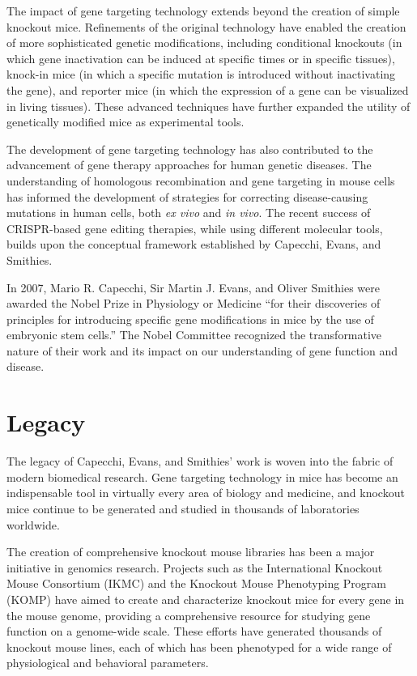 The impact of gene targeting technology extends beyond the creation of simple knockout mice. Refinements of the original technology have enabled the creation of more sophisticated genetic modifications, including conditional knockouts (in which gene inactivation can be induced at specific times or in specific tissues), knock-in mice (in which a specific mutation is introduced without inactivating the gene), and reporter mice (in which the expression of a gene can be visualized in living tissues). These advanced techniques have further expanded the utility of genetically modified mice as experimental tools.

The development of gene targeting technology has also contributed to the advancement of gene therapy approaches for human genetic diseases. The understanding of homologous recombination and gene targeting in mouse cells has informed the development of strategies for correcting disease-causing mutations in human cells, both \textit{ex vivo} and \textit{in vivo}. The recent success of CRISPR-based gene editing therapies, while using different molecular tools, builds upon the conceptual framework established by Capecchi, Evans, and Smithies.

In 2007, Mario R. Capecchi, Sir Martin J. Evans, and Oliver Smithies were awarded the Nobel Prize in Physiology or Medicine ``for their discoveries of principles for introducing specific gene modifications in mice by the use of embryonic stem cells.'' The Nobel Committee recognized the transformative nature of their work and its impact on our understanding of gene function and disease.

\section{Legacy}

The legacy of Capecchi, Evans, and Smithies' work is woven into the fabric of modern biomedical research. Gene targeting technology in mice has become an indispensable tool in virtually every area of biology and medicine, and knockout mice continue to be generated and studied in thousands of laboratories worldwide.

The creation of comprehensive knockout mouse libraries has been a major initiative in genomics research. Projects such as the International Knockout Mouse Consortium (IKMC) and the Knockout Mouse Phenotyping Program (KOMP) have aimed to create and characterize knockout mice for every gene in the mouse genome, providing a comprehensive resource for studying gene function on a genome-wide scale. These efforts have generated thousands of knockout mouse lines, each of which has been phenotyped for a wide range of physiological and behavioral parameters.


